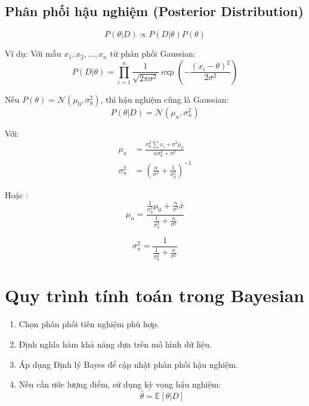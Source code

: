 \subsection{Phân phối hậu nghiệm (Posterior Distribution)}
\begin{equation}
P(\theta | D) \propto P(D | \theta) P(\theta)
\end{equation}

Ví dụ: Với mẫu $x_1, x_2, ..., x_n$ từ phân phối Gaussian:
\begin{equation}
P(D | \theta) = \prod_{i=1}^{n} \frac{1}{\sqrt{2\pi\sigma^2}} \exp\left(-\frac{(x_i - \theta)^2}{2\sigma^2}\right)
\end{equation}

Nếu $P(\theta) = \mathcal{N}(\mu_0, \sigma_0^2)$, thì hậu nghiệm cũng là Gaussian:
\begin{equation}
P(\theta | D) = \mathcal{N}(\mu_n, \sigma_n^2)
\end{equation}

Với:
\begin{align}
\mu_n &= \frac{\sigma_0^2 \sum x_i + \sigma^2 \mu_0}{n\sigma_0^2 + \sigma^2} \\
\sigma_n^2 &= \left(\frac{n}{\sigma^2} + \frac{1}{\sigma_0^2}\right)^{-1}
\end{align}


Hoặc :
\begin{equation}
    \mu_n = \frac{\frac{1}{\sigma_0^2} \mu_0 + \frac{n}{\sigma^2} \bar{x}}{\frac{1}{\sigma_0^2} + \frac{n}{\sigma^2}}
\end{equation}

\begin{equation}
    \sigma_n^2 = \frac{1}{\frac{1}{\sigma_0^2} + \frac{n}{\sigma^2}}
\end{equation}

\section*{Quy trình tính toán trong Bayesian}

\begin{enumerate}
    \item Chọn phân phối tiên nghiệm phù hợp.
    \item Định nghĩa hàm khả năng dựa trên mô hình dữ liệu.
    \item Áp dụng Định lý Bayes để cập nhật phân phối hậu nghiệm.
    \item Nếu cần ước lượng điểm, sử dụng kỳ vọng hậu nghiệm:
    \begin{equation}
        \hat{\theta} = \mathbb{E}[\theta | D]
    \end{equation}
\end{enumerate}


